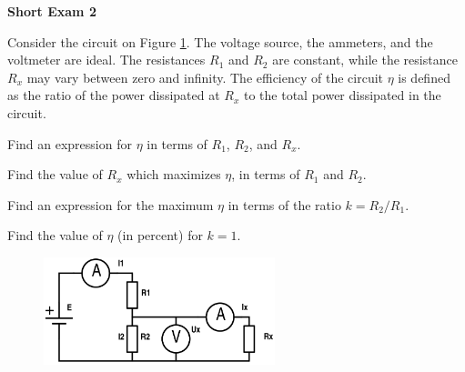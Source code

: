 \documentclass[../TST.tex]{subfiles}
\begin{document}
\begin{large}
	\textbf{Short Exam 2}
\end{large}

\begin{sproblem}
Consider the circuit on Figure \ref{fig1}. The voltage source, the ammeters, and the voltmeter are ideal. The resistances $R_1$ and $R_2$ are constant, while the resistance $R_x$ may vary between zero and infinity. The efficiency of the circuit $\eta$ is defined as the ratio of the power dissipated at $R_x$ to the total power dissipated in the circuit.
\begin{subpart}
	\item Find an expression for $\eta$ in terms of $R_1$, $R_2$, and $R_x$. 
	\item Find the value of $R_x$ which maximizes $\eta$, in terms of $R_1$ and $R_2$. 
	\item Find an expression for the maximum $\eta$ in terms of the ratio $k=R_2/R_1$. 
	\item Find the value of $\eta$ (in percent) for $k=1$. \\
\end{subpart}

\begin{figure}[h]
\centering
\includegraphics[width=0.6\textwidth]{fig/2015_l2.png}
\caption{}
\label{fig1}
\end{figure}
\end{sproblem}
\end{document}
